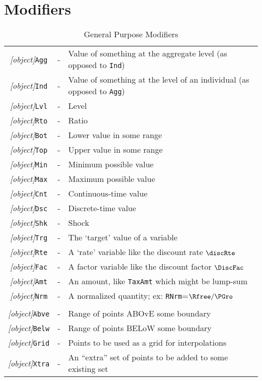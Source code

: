 \documentclass[12pt]{\econtex}
\begin{document}
\section{Modifiers}
\begin{table}[ht]
  \centering
  \begin{tabular}{|>{\ttfamily}ccl|} 		
    \hline
    \textit{[object]}\texttt{Agg} & - & Value of something at the aggregate level (as opposed to \texttt{Ind})
    \\ \textit{[object]}\texttt{Ind} & - & Value of something at the level of an individual (as opposed to \texttt{Agg})
    \\ \textit{[object]}\texttt{Lvl} & - & Level 
    \\ \textit{[object]}\texttt{Rto} & - & Ratio 
    \\ \textit{[object]}\texttt{Bot} & - & Lower value in some range 
    \\ \textit{[object]}\texttt{Top} & - & Upper value in some range 
    \\ \textit{[object]}\texttt{Min} & - & Minimum possible value 
    \\ \textit{[object]}\texttt{Max} & - & Maximum possible value 
    \\ \textit{[object]}\texttt{Cnt} & - & Continuous-time value
    \\ \textit{[object]}\texttt{Dsc} & - & Discrete-time value
    \\ \textit{[object]}\texttt{Shk} & - & Shock 
    \\ \textit{[object]}\texttt{Trg} & - & The `target' value of a variable 
    \\ \textit{[object]}\texttt{Rte} & - & A `rate' variable like the discount rate $\discRte$
    \\ \textit{[object]}\texttt{Fac} & - & A factor variable like the discount factor $\DiscFac$
    \\ \textit{[object]}\texttt{Amt} & - & An amount, like \texttt{TaxAmt} which might be lump-sum
    \\ \textit{[object]}\texttt{Nrm} & - & A normalized quantity; ex: \texttt{RNrm}=$\Rfree/\PGro$
    \\ 	\hline
    \\ \textit{[object]}\texttt{Abve} & - & Range of points ABOvE some boundary
    \\ \textit{[object]}\texttt{Belw} & - & Range of points BELoW some boundary
    \\ \textit{[object]}\texttt{Grid} & - & Points to be used as a grid for interpolations
    \\ \textit{[object]}\texttt{Xtra} & - & An ``extra'' set of points to be added to some existing set
  \end{tabular}
  \caption{General Purpose Modifiers}
  \label{table:General}
\end{table}	
\end{document}
